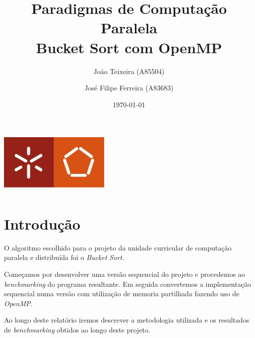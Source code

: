 \documentclass[a4paper]{report}
\begin{document}
\title{Paradigmas de Computação Paralela\\Bucket Sort com OpenMP}
\author{João Teixeira (A85504) \and José Filipe Ferreira (A83683)}
\date{\today}

\begin{center}
    \begin{minipage}{0.75\linewidth}
        \centering
        \includegraphics[width=0.4\textwidth]{images/eng.jpeg}\par\vspace{1cm}
        \vspace{1.5cm}
        \href{https://www.uminho.pt/PT}
        {\color{black}{\scshape\LARGE Universidade do Minho}} \par
        \vspace{1cm}
        \href{https://www.di.uminho.pt/}
        {\color{black}{\scshape\Large Departamento de Informática}} \par
        \vspace{1.5cm}
        \maketitle
    \end{minipage}
\end{center}

\tableofcontents

\pagebreak

\chapter{Introdução}
O algoritmo escolhido para o projeto da unidade curricular de computação
paralela e distribuída foi o \textit{Bucket Sort}.

Começamos por desenvolver uma versão sequencial do projeto e procedemos ao
\textit{benchmarking} do programa resultante. Em seguida convertemos a
implementação sequencial numa versão com utilização de memoria partilhada
fazendo uso de \textit{OpenMP}.

Ao longo deste relatório iremos descrever a metodologia utilizada e os
resultados de \textit{benchmarking} obtidos ao longo deste projeto.
\end{document}

